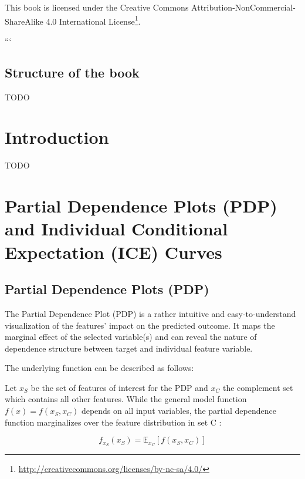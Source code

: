 \documentclass[
]{krantz}
\renewcommand{\href}[2]{#2\footnote{\url{#1}}}
\begin{document}
This book is licensed under the \href{http://creativecommons.org/licenses/by-nc-sa/4.0/}{Creative Commons Attribution-NonCommercial-ShareAlike 4.0 International License}.

```

\hypertarget{structure-of-the-book}{%
\section*{Structure of the book}\label{structure-of-the-book}}


TODO

\mainmatter

\hypertarget{introduction}{%
\chapter{Introduction}\label{introduction}}

TODO

\hypertarget{partial-dependence-plots-pdp-and-individual-conditional-expectation-ice-curves}{%
\chapter{Partial Dependence Plots (PDP) and Individual Conditional Expectation (ICE) Curves}\label{partial-dependence-plots-pdp-and-individual-conditional-expectation-ice-curves}}

\hypertarget{partial-dependence-plots-pdp}{%
\section{Partial Dependence Plots (PDP)}\label{partial-dependence-plots-pdp}}

The Partial Dependence Plot (PDP) is a rather intuitive and easy-to-understand visualization of the features' impact on the predicted outcome. It maps the marginal effect of the selected variable(s) and can reveal the nature of dependence structure between target and individual feature variable.\citep{molnar2019}

The underlying function can be described as follows:

Let \(x_S\) be the set of features of interest for the PDP and \(x_C\) the complement set which contains all other features.
While the general model function \(f(x) = f(x_S, x_C)\) depends on all input variables, the partial dependence function marginalizes over the feature distribution in set C \citep{hastie2013elements}:

\[f_{x_S}(x_S) = \mathbb{E}_{x_C}[f(x_S, x_C)]\]
\end{document}
